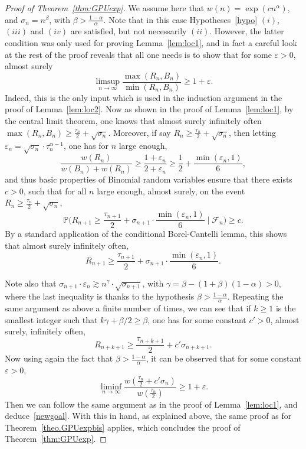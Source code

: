 \documentclass[11pt]{article}
\newcommand{\1}{{\text{\Large $\mathfrak 1$}}}
\begin{document}
\begin{proof}[Proof of Theorem~\ref{thm:GPUexp}]
We assume here that $w(n) = \exp(cn^\alpha)$, and $\sigma_n = n^\beta$, with $\beta> \frac{1-\alpha}{\alpha}$. 
Note that in this case Hypotheses~\ref{hypo} $(i)$, $(iii)$ and $(iv)$ are satisfied, but not necessarily $(ii)$. However, the latter condition was only used for proving Lemma~\ref{lem:loc1}, and in fact a careful look at the rest of the proof reveals that all one needs is to show that for some $\varepsilon>0$, almost surely 
\begin{equation}\label{newgoal}
\limsup_{n\to \infty} \frac{\max(R_n,B_n)}{\min(R_n,B_n)} \ge 1+\varepsilon. 
\end{equation} 
Indeed, this is the only input which is used in the induction argument in the proof of Lemma~\ref{lem:loc2}. 
Now as shown in the proof of Lemma~\ref{lem:loc1}, by the central limit theorem, one knows that almost surely infinitely often $\max(R_n,B_n) \ge \frac{\tau_n}{2} +\sqrt{\sigma_n}$. 
 Moreover, if say $R_n \ge \frac{\tau_n}{2} + \sqrt{\sigma_n}$, then letting $\varepsilon_n = \sqrt{\sigma_n} \cdot \tau_n^{\alpha-1}$, one has for $n$ large enough, 
$$ \frac{w(R_n)}{w(B_n) + w(R_n)} \ge \frac{1+\varepsilon_n}{2+\varepsilon_n}\ge \frac 12 + \frac{\min(\varepsilon_n, 1)}{6},$$ and thus basic properties of Binomial random variables ensure that there exists $c>0$, such that for all $n$ large enough, almost surely, on the event $R_n \ge \frac{\tau_n}{2} + \sqrt{\sigma_n}$, 
$$\mathbb P\big(R_{n+1}\ge \frac{\tau_{n+1}}2 +  \sigma_{n+1}\cdot \frac{\min(\varepsilon_n,1)}{6} \mid \mathcal F_n\big)\ge c. $$  
By a standard application of the conditional Borel-Cantelli lemma, this shows that almost surely infinitely often, 
$$R_{n+1} \ge  \frac{\tau_{n+1}}2 +  \sigma_{n+1}\cdot \frac{\min(\varepsilon_n,1)}{6}.$$

Note also that $\sigma_{n+1}\cdot \varepsilon_n \gtrsim n^\gamma\cdot \sqrt{\sigma_{n+1}}$, with $\gamma =  \beta -(1+\beta)(1- \alpha) > 0$, where the last inequality is thanks to the hypothesis $\beta> \frac{1-\alpha}{\alpha}$. Repeating the same argument as above a finite number of times, we can see that if $k\ge 1$ is the smallest integer such that 
$k\gamma + \beta/2 \ge \beta$, one has for some constant $c'>0$, almost surely, infinitely often,  
$$R_{n+k+1} \ge  \frac{\tau_{n+k+1}}{2} + c'\sigma_{n+k+1}. $$
Now using again the fact that $\beta> \frac{1-\alpha}{\alpha}$, it can be observed that for some constant $\varepsilon>0$, 
$$\liminf_{n\to \infty} \frac{w(\frac{\tau_n}{2} + c'\sigma_n) }{w(\frac{\tau_n}{2} ) }\ge 1+ \varepsilon.$$ 
Then we can follow the same argument as in the proof of Lemma~\ref{lem:loc1}, and deduce~\eqref{newgoal}. 
With this in hand, as explained above, the same proof as for Theorem~\ref{theo.GPUexpbis} applies, which concludes the proof of Theorem~\ref{thm:GPUexp}. 
\end{proof}
\end{document}
